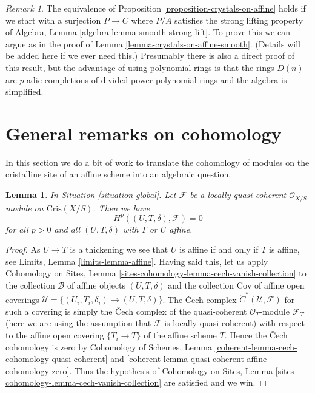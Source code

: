 \documentclass{stacks-project}
\theoremstyle{plain}
\newtheorem{lemma}[subsection]{Lemma}
\theoremstyle{definition}
\theoremstyle{remark}
\newtheorem{remark}[subsection]{Remark}
\numberwithin{equation}{subsection}
\begin{document}
\begin{remark}
\label{remark-equivalence-more-general}
The equivalence of Proposition \ref{proposition-crystals-on-affine}
holds if we start with a surjection $P \to C$ where $P/A$ satisfies the
strong lifting property of
Algebra, Lemma \ref{algebra-lemma-smooth-strong-lift}.
To prove this we can argue as in the proof of
Lemma \ref{lemma-crystals-on-affine-smooth}.
(Details will be added here if we ever need this.)
Presumably there is also a direct proof of this result, but the advantage
of using polynomial rings is that the rings $D(n)$ are $p$-adic completions
of divided power polynomial rings and the algebra is simplified.
\end{remark}



\section{General remarks on cohomology}
\label{section-cohomology-lqc}

\noindent
In this section we do a bit of work to translate the cohomology
of modules on the cristalline site of an affine scheme into
an algebraic question.

\begin{lemma}
\label{lemma-vanishing-lqc}
In Situation \ref{situation-global}.
Let $\mathcal{F}$ be a locally quasi-coherent $\mathcal{O}_{X/S}$-module
on $\text{Cris}(X/S)$. Then we have
$$
H^p((U, T, \delta), \mathcal{F}) = 0
$$
for all $p > 0$ and all $(U, T, \delta)$ with $T$ or $U$ affine.
\end{lemma}

\begin{proof}
As $U \to T$ is a thickening we see that $U$ is affine if and only if $T$
is affine, see Limits, Lemma \ref{limits-lemma-affine}.
Having said this, let us apply
Cohomology on Sites, Lemma \ref{sites-cohomology-lemma-cech-vanish-collection}
to the collection $\mathcal{B}$ of affine objects $(U, T, \delta)$ and the
collection $\text{Cov}$ of affine open coverings
$\mathcal{U} = \{(U_i, T_i, \delta_i) \to (U, T, \delta)\}$. The
{\v C}ech complex
${\check C}^*(\mathcal{U}, \mathcal{F})$ for such a covering is simply
the {\v C}ech complex of the quasi-coherent $\mathcal{O}_T$-module
$\mathcal{F}_T$
(here we are using the assumption that $\mathcal{F}$ is locally quasi-coherent)
with respect to the affine open covering $\{T_i \to T\}$ of the
affine scheme $T$. Hence the {\v C}ech cohomology is zero by
Cohomology of Schemes, Lemma
\ref{coherent-lemma-cech-cohomology-quasi-coherent} and
\ref{coherent-lemma-quasi-coherent-affine-cohomology-zero}.
Thus the hypothesis of
Cohomology on Sites, Lemma \ref{sites-cohomology-lemma-cech-vanish-collection}
are satisfied and we win.
\end{proof}
\end{document}
